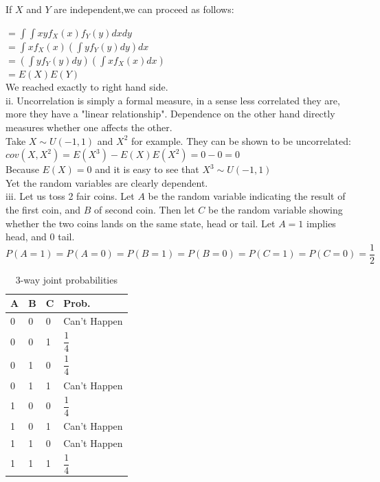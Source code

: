 \documentclass[12pt]{article}
\begin{document}
If $X$ and $Y$ are independent,we can proceed as follows:

$ = \displaystyle \int \int xyf_X(x)f_Y(y)dxdy  $ \\

$ = \displaystyle \int x f_X(x) (\int y f_Y(y) dy) dx  $  \\

$ = \displaystyle  (\int y f_Y(y) dy)  (\int x f_X(x) dx)  $ \\

$ = E(X)E(Y) $ \\

We reached exactly to right hand side.   \\

ii. Uncorrelation is simply a formal measure, in a sense less correlated they are, more they have a "linear relationship". Dependence on the other hand directly measures whether one affects the other. \\

Take $X \sim U(-1,1)$ and $X^2$ for example. They can be shown to be uncorrelated: \\

$cov(X,X^2) = E(X^3) - E(X)E(X^2)= 0 - 0 = 0 $ \\

Because $E(X)=0$ and it is easy to see that $X^3 \sim U(-1,1)$ \\

Yet the random variables are clearly dependent.\\

iii. Let us toss 2 fair coins. Let $A$ be the random variable indicating the result of the first coin, and $B$ of second coin. Then let $C$ be the random variable showing whether the two coins lands on the same state, head or tail. Let $A=1$ implies head, and  $0$ tail. \\

$P(A=1) = P(A=0) = P(B=1) = P(B=0) = P(C=1) = P(C=0) = \dfrac{1}{2} $ \\

\begin{table}[]
\begin{tabular}{|l|l|l|l|}
\hline
A & B & C & Prob. \\ \hline
0 & 0 & 0 &      Can't Happen   \\ \hline
0 & 0 & 1 &        $\dfrac{1}{4}$ \\ \hline
0 & 1 & 0 &       $\dfrac{1}{4}$  \\ \hline
0 & 1 & 1 &       Can't Happen \\ \hline
1 & 0 & 0 &       $\dfrac{1}{4}$  \\ \hline
1 & 0 & 1 &       Can't Happen  \\ \hline
1 & 1 & 0 &        Can't Happen \\ \hline
1 & 1 & 1 &        $\dfrac{1}{4}$ \\ \hline
\end{tabular}
\caption{3-way joint probabilities }
\label{my-label}
\end{table}
\end{document}

